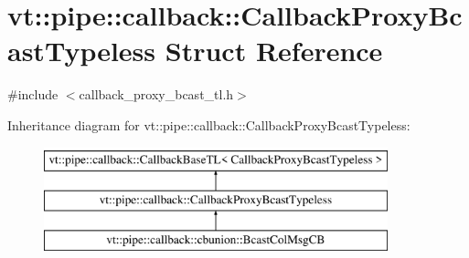 \hypertarget{structvt_1_1pipe_1_1callback_1_1_callback_proxy_bcast_typeless}{}\section{vt\+:\+:pipe\+:\+:callback\+:\+:Callback\+Proxy\+Bcast\+Typeless Struct Reference}
\label{structvt_1_1pipe_1_1callback_1_1_callback_proxy_bcast_typeless}


{\ttfamily \#include $<$callback\+\_\+proxy\+\_\+bcast\+\_\+tl.\+h$>$}

Inheritance diagram for vt\+:\+:pipe\+:\+:callback\+:\+:Callback\+Proxy\+Bcast\+Typeless\+:\begin{figure}[H]
\begin{center}
\leavevmode
\includegraphics[height=3.000000cm]{structvt_1_1pipe_1_1callback_1_1_callback_proxy_bcast_typeless}
\end{center}
\end{figure}
